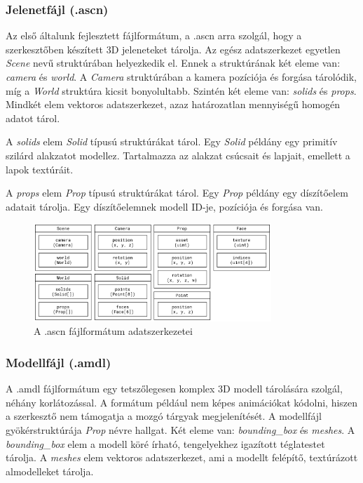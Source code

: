 \pagebreak

\subsubsection{Jelenetfájl (.ascn)}

Az első általunk fejlesztett fájlformátum, a .ascn arra szolgál, hogy a szerkesztőben készített
3D jeleneteket tárolja. Az egész adatszerkezet egyetlen \emph{Scene} nevű struktúrában helyezkedik
el. Ennek a struktúrának két eleme van: \emph{camera} és \emph{world}. A \emph{Camera} struktúrában
a kamera pozíciója és forgása tárolódik, míg a \emph{World} struktúra kicsit bonyolultabb. Szintén
két eleme van: \emph{solids} és \emph{props}. Mindkét elem vektoros adatszerkezet, azaz
határozatlan mennyiségű homogén adatot tárol.

A \emph{solids} elem \emph{Solid} típusú struktúrákat tárol. Egy \emph{Solid} példány egy primitív
szilárd alakzatot modellez. Tartalmazza az alakzat csúcsait és lapjait, emellett a lapok textúráit.

A \emph{props} elem \emph{Prop} típusú struktúrákat tárol. Egy \emph{Prop} példány egy díszítőelem
adatait tárolja. Egy díszítőelemnek modell ID-je, pozíciója és forgása van.

\begin{figure}[h]
      \centering
      \includegraphics[width=0.8\textwidth]{parts/developer-documentation/editor/images/ascn.png}
      \caption{A .ascn fájlformátum adatszerkezetei}
\end{figure}

\pagebreak

\subsubsection{Modellfájl (.amdl)}

A .amdl fájlformátum egy tetszőlegesen komplex 3D modell tárolására szolgál, néhány korlátozással.
A formátum például nem képes animációkat kódolni, hiszen a szerkesztő nem támogatja a mozgó tárgyak
megjelenítését. A modellfájl gyökérstruktúrája \emph{Prop} névre hallgat. Két eleme van:
\emph{bounding\_box} és \emph{meshes}. A \emph{bounding\_box} elem a modell köré írható,
tengelyekhez igazított téglatestet tárolja. A \emph{meshes} elem vektoros adatszerkezet, ami a
modellt felépítő, textúrázott almodelleket tárolja.

